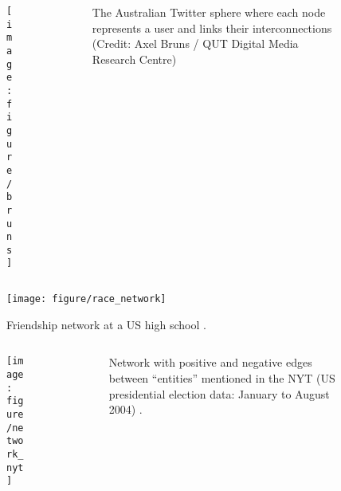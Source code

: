 \documentclass[serif, aspectratio=169]{beamer}
\begin{document}
\begin{frame}

\begin{columns}
\begin{column}{0.8\textwidth}
\begin{figure}
    \centering
    \texttt{[image: figure/bruns]}
\end{figure}
\end{column}
\begin{column}{0.2\textwidth}
\begin{figure}
\caption{The Australian Twitter sphere where each node represents a user and links their interconnections (Credit: Axel Bruns / QUT Digital Media Research Centre)}
\end{figure}
\end{column}
\end{columns}

\end{frame}

\begin{frame}

\begin{figure}
    \centering
    \texttt{[image: figure/race\_network]}
\caption{Friendship network at a US high school \autocite[221]{newman_networks_2010}.}
\end{figure}

\end{frame}

\begin{frame}

\begin{columns}
\begin{column}{0.8\textwidth}
\begin{figure}
    \centering
    \texttt{[image: figure/network\_nyt]}
\end{figure}
\end{column}
\begin{column}{0.2\textwidth}
\begin{figure}
\caption{Network with positive and negative edges between ``entities'' mentioned in the NYT (US presidential election data: January to August 2004) \autocite{sudhahar_network_2015}.}
\end{figure}
\end{column}
\end{columns}

\end{frame}
\end{document}
